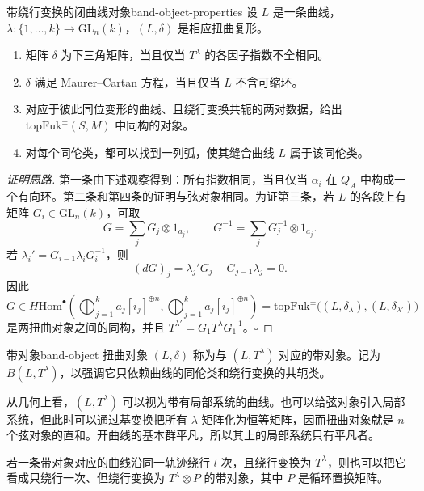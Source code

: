 \begin{lemma}{带绕行变换的闭曲线对象}{band-object-properties}
设 $L$ 是一条曲线，$\lambda\colon\{1,\ldots,k\}\to\mathrm{GL}_n(k)$，$(L,\delta)$ 是相应扭曲复形。
\begin{enumerate}[label=(\roman*)]
  \item 矩阵 $\delta$ 为下三角矩阵，当且仅当 $T^\lambda$ 的各因子指数不全相同。
  \item $\delta$ 满足 Maurer--Cartan 方程，当且仅当 $L$ 不含可缩环。
  \item 对应于彼此同位变形的曲线、且绕行变换共轭的两对数据，给出 $\mathrm{topFuk}^{\pm}(S,M)$ 中同构的对象。
  \item 对每个同伦类，都可以找到一列弧，使其缝合曲线 $L$ 属于该同伦类。
\end{enumerate}
\end{lemma}
\begin{proof}[证明思路]
第一条由下述观察得到：所有指数相同，当且仅当 $\alpha_i$ 在 $Q_A$ 中构成一个有向环。第二条和第四条的证明与弦对象相同。为证第三条，若 $L$ 的各段上有矩阵 $G_i\in\mathrm{GL}_n(k)$，可取
\[
  G=\sum_j G_j\otimes1_{a_j},\qquad G^{-1}=\sum_j G_j^{-1}\otimes1_{a_j}.
\]
若 $\lambda_i'=G_{i-1}\lambda_iG_i^{-1}$，则
\[
  (dG)_j=\lambda_j'G_j-G_{j-1}\lambda_j=0.
\]
因此
\[
G\in H\mathrm{Hom}^{\bullet}\left(
  \bigoplus_{j=1}^k a_j[i_j]^{\oplus n},
  \bigoplus_{j=1}^k a_j[i_j]^{\oplus n}
\right)
=\mathrm{topFuk}^{\pm}\bigl((L,\delta_\lambda),(L,\delta_{\lambda'})\bigr)
\]
是两扭曲对象之间的同构，并且 $T^{\lambda'}=G_1T^\lambda G_1^{-1}$。\hfill$\square$
\end{proof}

\begin{definition}{带对象}{band-object}
扭曲对象 $(L,\delta)$ 称为与 $(L,T^\lambda)$ 对应的带对象。记为 $B(L,T^\lambda)$，以强调它只依赖曲线的同伦类和绕行变换的共轭类。
\end{definition}

\begin{note}\label{note:bands-local-systems}
从几何上看，$(L,T^\lambda)$ 可以视为带有局部系统的曲线。也可以给弦对象引入局部系统，但此时可以通过基变换把所有 $\lambda$ 矩阵化为恒等矩阵，因而扭曲对象就是 $n$ 个弦对象的直和。开曲线的基本群平凡，所以其上的局部系统只有平凡者。

若一条带对象对应的曲线沿同一轨迹绕行 $l$ 次，且绕行变换为 $T^\lambda$，则也可以把它看成只绕行一次、但绕行变换为 $T^\lambda\otimes P$ 的带对象，其中 $P$ 是循环置换矩阵。
\end{note}

